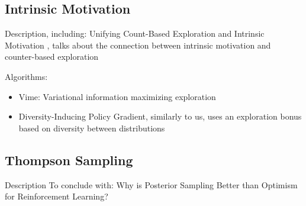 \subsection{Intrinsic Motivation}
Description, including: Unifying Count-Based Exploration and Intrinsic Motivation \cite{bellemare2016unifying}, talks about the connection between intrinsic motivation and counter-based exploration %

Algorithms:
\begin{itemize}
\item  Vime: Variational information maximizing exploration \cite{houthooft2016vime}
\item  Diversity-Inducing Policy Gradient\cite{masooddiversity}, similarly to us, uses an exploration bonus based on diversity between distributions
\end{itemize}

\subsection{Thompson Sampling}
Description
To conclude with: Why is Posterior Sampling Better than Optimism for Reinforcement Learning? \cite{osband2017posterior}